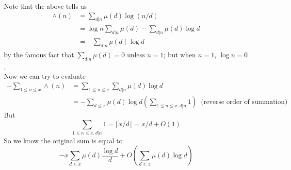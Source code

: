 \documentclass[a4paper]{article}
\begin{document}
Note that the above tells us
\begin{equation*}
\begin{aligned}
\wedge(n) &= \sum_{d|n} \mu(d) \log(n/d)\\
&=\log n \sum_{d|n}\mu(d) - \sum_{d|n} \mu(d)\log d\\
&= -\sum_{d|n} \mu(d)\log d
\end{aligned}
\end{equation*}
by the famous fact that $\sum_{d|n}\mu(d)=0$ unless $n=1$; but when $n=1$, $\log n = 0$.\\
Now we can try to evaluate
\begin{equation*}
\begin{aligned}
-\sum_{1 \leq n \leq x} \wedge(n) &= \sum_{1 \leq n \leq x} \sum_{d|n} \mu(d) \log d \\
&= -\sum_{d \leq x} \mu(d) \log d (\sum_{1 \leq n \leq x, d|n} 1)\ \text{ (reverse order of summation)}
\end{aligned}
\end{equation*}
But
$$\sum_{1 \leq n \leq x, d|n} 1 = \lfloor x/d \rfloor = x/d + O(1)$$
So we know the original sum is equal to
$$-x\sum_{d \leq x} \mu(d) \frac{\log d}{d} + O(\sum_{d \leq x} \mu(d) \log d)$$
\end{document}
